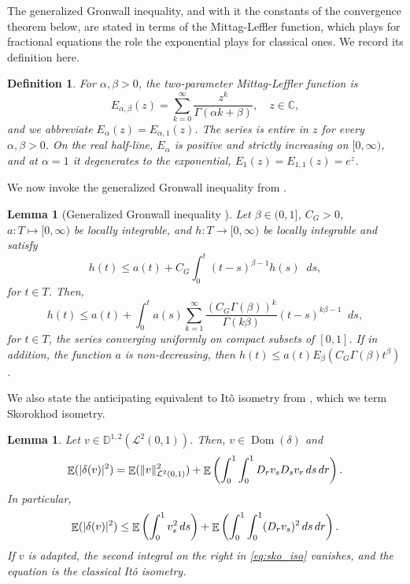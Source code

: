 \documentclass[11pt, a4paper]{article}
\theoremstyle{theoremstyle}
\newtheorem{lemma}[theorem]{Lemma}
\theoremstyle{definitionstyle}
\newtheorem{definition}[theorem]{Definition}
\newcommand{\dd}{\mathop{}\!d}
\DeclareMathOperator{\EE}{\mathbb E}
\DeclareMathOperator{\Dom}{\operatorname{Dom}}
\DeclarePairedDelimiter{\norm}{\lVert}{\rVert}
\DeclarePairedDelimiter{\abs}{\lvert}{\rvert}
\begin{document}
The generalized Gronwall inequality, and with it the constants of the convergence theorem below, are stated in terms of the Mittag-Leffler function, which plays for fractional equations the role the exponential plays for classical ones. We record its definition here.
\begin{definition}\label{def:mittag_leffler}
    For $\alpha, \beta > 0$, the two-parameter \emph{Mittag-Leffler function} is
    \begin{equation}\label{eq:mittag_leffler}
        E_{\alpha, \beta}(z) = \sum_{k=0}^\infty \frac{z^k}{\Gamma(\alpha k + \beta)}, \quad z \in \mathbb C,
    \end{equation}
    and we abbreviate $E_\alpha(z) = E_{\alpha, 1}(z)$. The series is entire in $z$ for every $\alpha, \beta > 0$. On the real half-line, $E_\alpha$ is positive and strictly increasing on $[0, \infty)$, and at $\alpha = 1$ it degenerates to the exponential, $E_1(z) = E_{1,1}(z) = e^z$.
\end{definition}

We now invoke the generalized Gronwall inequality from \cite{YE20071075}.
\begin{lemma}[Generalized Gronwall inequality \cite{YE20071075}]\label{lem:conv_gronwall}
    Let $\beta \in (0, 1]$, $C_G > 0$, $a : T \mapsto [0, \infty)$ be locally integrable, and $h : T \to [0, \infty)$ be locally integrable and satisfy
    \begin{equation}
        h(t) \leq a(t) + C_G\int_0^t (t - s)^{\beta - 1}h(s)\dd{s},
    \end{equation}
    for $t \in T$. Then,
    \begin{equation}
        h(t) \leq a(t) + \int_0^t a(s)\sum_{k=1}^{\infty} \frac{(C_G\Gamma(\beta))^k}{\Gamma(k\beta)}(t - s)^{k\beta-1}\dd{s},
    \end{equation}
    for $t \in T$, the series converging uniformly on compact subsets of $[0, 1]$. If in addition, the function $a$ is non-decreasing, then $h(t) \leq a(t)E_\beta(C_G\Gamma(\beta)t^\beta)$.
\end{lemma}

We also state the anticipating equivalent to It\^o isometry from \cite{nualart2006malliavin}, which we term Skorokhod isometry.
\begin{lemma}\label{lem:sko_iso}
    Let $v \in \mathbb D^{1,2}(\mathcal L^2(0, 1))$. Then, $v \in \Dom(\delta)$ and
    \begin{equation}\label{eq:sko_iso}
        \EE (\abs{\delta(v)}^2) = \EE (\norm{v}^2_{\mathcal L^2(0, 1)}) + \EE \left ( \int_0^1 \int_0^1 D_rv_sD_sv_r\dd{s}\dd{r}\right ).
    \end{equation}
    In particular,
    \begin{equation}
        \EE (\abs{\delta(v)}^2) \leq \EE \left ( \int_0^1 v_s^2 \dd{s} \right ) + \EE \left ( \int_0^1 \int_0^1 (D_rv_s)^2 \dd{s}\dd{r} \right ).
    \end{equation}
    If $v$ is adapted, the second integral on the right in \eqref{eq:sko_iso} vanishes, and the equation is the classical It\^o isometry.
\end{lemma}
\end{document}
